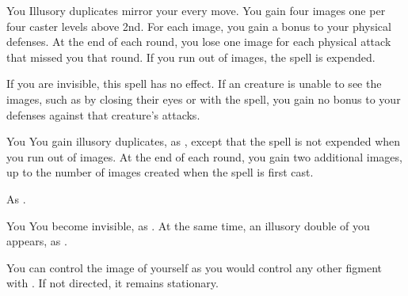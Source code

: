 \begin{spellheader}
\end{spellheader}
\begin{spelleffects}
    \begin{spelltarget}{You}
        \spelleffect Illusory duplicates mirror your every move. You gain four images \add one per four caster levels above 2nd. For each image, you gain a  bonus to your physical defenses. At the end of each round, you lose one image for each physical attack that missed you that round. If you run out of images, the spell is expended.
    \end{spelltarget}
\end{spelleffects}
\begin{spellfooter}
    \spellnotes If you are invisible, this spell has no effect. If an creature is unable to see the images, such as by closing their eyes or with the  spell, you gain no bonus to your defenses against that creature's attacks.
\end{spellfooter}

\begin{spellheader}
    \spelldur{\durshort \dismissable}
\end{spellheader}
\begin{spelleffects}
    \begin{spelltarget}{You}
        \spelleffect You gain illusory duplicates, as , except that the spell is not expended when you run out of images. At the end of each round, you gain two additional images, up to the number of images created when the spell is first cast.
    \end{spelltarget}
\end{spelleffects}
\begin{spellfooter}
    \spellnotes As .
\end{spellfooter}

\begin{spellheader}
    \spelldur{\durshort \dismissable}
\end{spellheader}
\begin{spelleffects}
    \begin{spelltarget}{You}
        \spelleffect You become invisible, as . At the same time, an illusory double of you appears, as .

        You can control the image of yourself as you would control any other figment with . If not directed, it remains stationary.
    \end{spelltarget}
\end{spelleffects}


